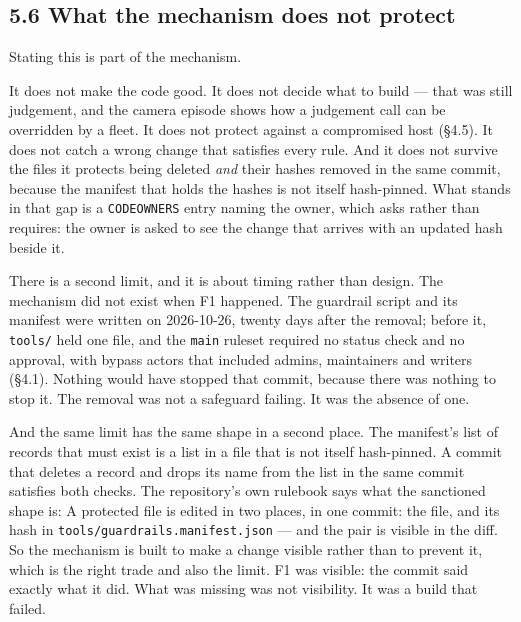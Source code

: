 \documentclass[11pt,a4paper]{article}
\begin{document}
\subsection*{5.6 What the mechanism does not protect}

Stating this is part of the mechanism.

It does not make the code good. It does not decide what to build --- that was still judgement, and the camera episode shows how a judgement call can be overridden by a fleet. It does not protect against a compromised host (\S{}4.5). It does not catch a wrong change that satisfies every rule. And it does not survive the files it protects being deleted \emph{and} their hashes removed in the same commit, because the manifest that holds the hashes is not itself hash-pinned. What stands in that gap is a \texttt{CODEOWNERS} entry naming the owner, which asks rather than requires: the owner is asked to see the change that arrives with an updated hash beside it.

There is a second limit, and it is about timing rather than design. The mechanism did not exist when F1 happened. The guardrail script and its manifest were written on 2026-10-26, twenty days after the removal; before it, \texttt{tools/} held one file, and the \texttt{main} ruleset required no status check and no approval, with bypass actors that included admins, maintainers and writers (\S{}4.1). Nothing would have stopped that commit, because there was nothing to stop it. The removal was not a safeguard failing. It was the absence of one.

And the same limit has the same shape in a second place. The manifest's list of records that must exist is a list in a file that is not itself hash-pinned. A commit that deletes a record and drops its name from the list in the same commit satisfies both checks. The repository's own rulebook says what the sanctioned shape is: \textquotedbl{}A protected file is edited in two places, in one commit: the file, and its hash in \texttt{tools/guardrails.manifest.json}\textquotedbl{} --- and the pair is visible in the diff. So the mechanism is built to make a change visible rather than to prevent it, which is the right trade and also the limit. F1 was visible: the commit said exactly what it did. What was missing was not visibility. It was a build that failed.
\end{document}

